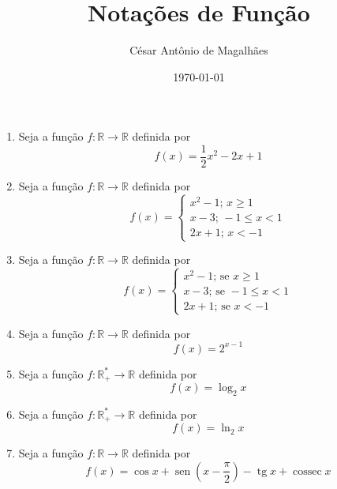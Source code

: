 \documentclass[12pt,a4paper]{article}
\title{Notações de Função}
\author{César Antônio de Magalhães}
\date{\today}
\DeclareMathOperator{\sen}{sen}
\DeclareMathOperator{\tg}{tg}
\DeclareMathOperator{\cossec}{cossec}
\begin{document}
	\begin{enumerate}
		\item Seja a função $f : \mathbb{R} \to \mathbb{R}$ definida por 
		$$f(x) = \dfrac{1}{2}x^2 - 2x + 1$$
		\item Seja a função $f : \mathbb{R} \to \mathbb{R}$ definida por
		$$f(x) = 
			\begin{cases}
				x^2 - 1 ;\, x \geq 1 \\
				x - 3 ;\, -1 \leq x < 1 \\
				2x + 1 ;\, x < -1
			\end{cases}
		$$
		\item Seja a função $f : \mathbb{R} \to \mathbb{R}$ definida por
		$$f(x) = 
			\begin{cases}
				x^2 - 1 ;\, \textrm{se } x \geq 1 \\
				x - 3 ;\, \textrm{se } -1 \leq x < 1 \\
				2x + 1 ;\, \textrm{se } x < -1
			\end{cases}
		$$
		\item Seja a função $f : \mathbb{R} \to \mathbb{R}$ definida por 
		$$f(x) = 2^{x - 1}$$
		\item Seja a função $f : \mathbb{R}^*_+ \to \mathbb{R}$ definida por 
		$$f(x) = \log_2 x$$
		\item Seja a função $f : \mathbb{R}^*_+ \to \mathbb{R}$ definida por 
		$$f(x) = \ln_2 x$$
		\item Seja a função $f : \mathbb{R} \to \mathbb{R}$ definida por 
		$$f(x) = \cos x + \sen \left(x - \dfrac{\pi}{2}\right) - \tg x + \cossec x$$	
	\end{enumerate}	
\end{document}
